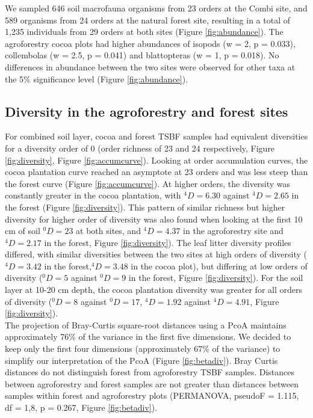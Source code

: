 \documentclass[fleqn,10pt]{ArtEcoFoG} %
\begin{document}
\normalsize

We sampled 646 soil macrofauna organisms from 23 orders at the Combi site, and 589 organisms from 24 orders at the natural forest site, resulting in a total of 1,235 individuals from 29 orders at both sites (Figure \ref{fig:abundance}). The agroforestry cocoa plots had higher abundances of isopods (w = 2, p = 0.033), collembolas (w = 2.5, p = 0.041) and blattopteras (w = 1, p = 0.018). No differences in abundance between the two sites were observed for other taxa at the 5\% significance level (Figure \ref{fig:abundance}).

\subsection{Diversity in the agroforestry and forest sites}\label{diversity-in-the-agroforestry-and-forest-sites}

For combined soil layer, cocoa and forest TSBF samples had equivalent diversities for a diversity order of 0 (order richness of 23 and 24 respectively, Figure \ref{fig:diversity}, Figure \ref{fig:accumcurve}). Looking at order accumulation curves, the cocoa plantation curve reached an asymptote at 23 orders and was less steep than the forest curve (Figure \ref{fig:accumcurve}). At higher orders, the diversity was constantly greater in the cocoa plantation, with \(^4D = 6.30\) against \(^4D = 2.65\) in the forest (Figure \ref{fig:diversity}). This pattern of similar richness but higher diversity for higher order of diversity was also found when looking at the first 10 cm of soil \(^0D = 23\) at both sites, and \(^4D = 4.37\) in the agroforestry site and \(^4D = 2.17\) in the forest, Figure \ref{fig:diversity}). The leaf litter diversity profiles differed, with similar diversities between the two sites at high orders of diversity (\(^4D = 3.42\) in the forest,\(^4D = 3.48\) in the cocoa plot), but differing at low orders of diversity (\(^0D = 5\) against \(^0D = 9\) in the forest, Figure \ref{fig:diversity}). For the soil layer at 10-20 cm depth, the cocoa plantation diversity was greater for all orders of diversity (\(^0D = 8\) against \(^0D = 17\), \(^4D = 1.92\) against \(^4D = 4.91\), Figure \ref{fig:diversity}).\\
The projection of Bray-Curtis square-root distances using a PcoA maintains approximately 76\% of the variance in the first five dimensions. We decided to keep only the first four dimensions (approximately 67\% of the variance) to simplify our interpretation of the PcoA (Figure \ref{fig:betadiv}). Bray Curtis distances do not distinguish forest from agroforestry TSBF samples. Distances between agroforestry and forest samples are not greater than distances between samples within forest and agroforestry plots (PERMANOVA, pseudoF = 1.115, df = 1,8, p = 0.267, Figure \ref{fig:betadiv}).
\end{document}
